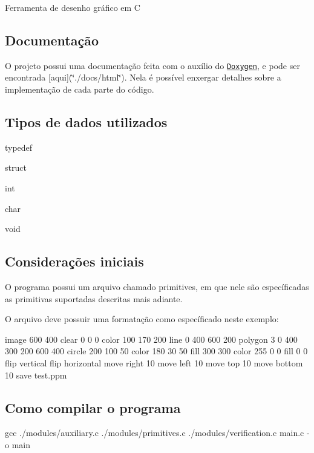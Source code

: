 Ferramenta de desenho gráfico em C

\subsection*{Documentação}

O projeto possui uma documentação feita com o auxílio do \href{http://www.doxygen.nl/}{\tt Doxygen}, e pode ser encontrada \mbox{[}aqui\mbox{]}(\char`\"{}./docs/html\char`\"{}). Nela é possível enxergar detalhes sobre a implementação de cada parte do código.

\subsection*{Tipos de dados utilizados}


\begin{DoxyItemize}
\item typedef
\item struct
\item int
\item char
\item void
\end{DoxyItemize}

\subsection*{Considerações iniciais}

O programa possui um arquivo chamado {\ttfamily primitives}, em que nele são específicadas as primitivas suportadas descritas mais adiante.

O arquivo deve possuir uma formatação como específicado neste exemplo\+: 
\begin{DoxyCode}
image 600 400
clear 0 0 0
color 100 170 200
line 0 400 600 200
polygon 3 0 400 300 200 600 400
circle 200 100 50
color 180 30 50
fill 300 300
color 255 0 0
fill 0 0
flip vertical
flip horizontal
move right 10
move left 10
move top 10
move bottom 10
save test.ppm
\end{DoxyCode}


\subsection*{Como compilar o programa}


\begin{DoxyCode}
gcc ./modules/auxiliary.c ./modules/primitives.c ./modules/verification.c main.c -o main
\end{DoxyCode}


